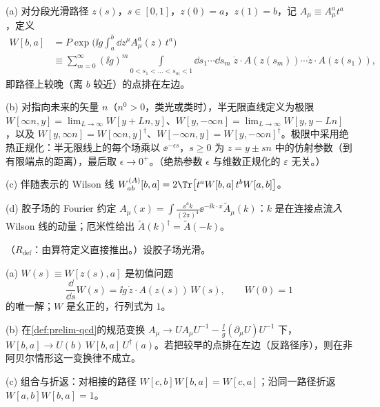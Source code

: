 \begin{definition}[Wilson 线]\label{def:prelim-wilson}
(a) 对分段光滑路径 $z(s)$，$s\in[0,1]$，$z(0)=a$，$z(1)=b$，记 $A_\mu\equiv A^a_\mu t^a$，定义
\begin{equation}\label{eq:prelim-W}
\begin{aligned}
W[b,a]&=P\exp\Big(\ii g\int_a^b\dd z^\mu A^a_\mu(z)\,t^a\Big)\\
&\equiv\sum_{m=0}^\infty(\ii g)^m\!\!\int\limits_{0<s_1<\dots<s_m<1}\!\!\dd s_1\cdots\dd s_m\;\dot z\cdot A(z(s_m))\cdots\dot z\cdot A(z(s_1)),
\end{aligned}
\end{equation}
即路径上较晚（离 $b$ 较近）的点排在左边。%
\par
(b) 对指向未来的矢量 $n$（$n^0>0$，类光或类时），半无限直线定义为极限 $W[\infty n,y]=\lim_{L\to\infty}W[y+Ln,y]$、$W[y,-\infty n]=\lim_{L\to\infty}W[y,y-Ln]$，以及 $W[y,\infty n]=W[\infty n,y]^\dagger$、$W[-\infty n,y]=W[y,-\infty n]^\dagger$。极限中采用绝热正规化：半无限线上的每个场乘以 $\ee^{-\epsilon s}$，$s\ge0$ 为 $z=y\pm sn$ 中的仿射参数（到有限端点的距离），最后取 $\epsilon\to0^+$。（绝热参数 $\epsilon$ 与维数正规化的 $\varepsilon$ 无关。）
\par
(c) 伴随表示的 Wilson 线 $W^{(A)}_{ab}[b,a]=2\Tr\big[t^aW[b,a]\,t^bW[a,b]\big]$。
\par
(d) 胶子场的 Fourier 约定 $A_\mu(x)=\int\frac{\dd^4k}{(2\pi)^4}\ee^{-\ii k\cdot x}\tilde A_\mu(k)$：$k$ 是在连接点流\emph{入} Wilson 线的动量；厄米性给出 $\tilde A(k)^\dagger=\tilde A(-k)$。
\end{definition}

\begin{proposition}\label{prop:prelim-wilson-covariance}
（$R_{\mathrm{def}}$：由算符定义直接推出。）设胶子场光滑。
\par
(a) $W(s)\equiv W[z(s),a]$ 是初值问题
\begin{equation}\label{eq:prelim-W-ode}
\frac{\dd}{\dd s}W(s)=\ii g\,\dot z\cdot A(z(s))\,W(s),\qquad W(0)=1
\end{equation}
的唯一解；$W$ 是幺正的，行列式为 $1$。
\par
(b) 在\cref{def:prelim-qcd}的规范变换 $A_\mu\to UA_\mu U^{-1}-\frac{\ii}{g}(\partial_\mu U)U^{-1}$ 下，$W[b,a]\to U(b)\,W[b,a]\,U^\dagger(a)$。若把较早的点排在左边（反路径序），则在非阿贝尔情形这一变换律不成立。
\par
(c) 组合与折返：对相接的路径 $W[c,b]W[b,a]=W[c,a]$；沿同一路径折返 $W[a,b]W[b,a]=1$。
\end{proposition}

